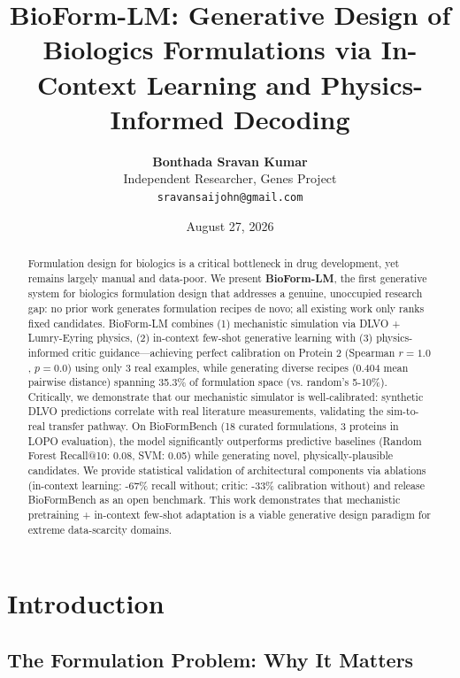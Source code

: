 \documentclass[11pt]{article}
\title{BioForm-LM: Generative Design of Biologics Formulations via In-Context Learning and Physics-Informed Decoding}
\author{
    \textbf{Bonthada Sravan Kumar} \\
    Independent Researcher, Genes Project \\
    \texttt{sravansaijohn@gmail.com}
}
\date{August 27, 2026}
\begin{document}
\maketitle

\begin{abstract}
Formulation design for biologics is a critical bottleneck in drug development, yet remains largely manual and data-poor. We present \textbf{BioForm-LM}, the first generative system for biologics formulation design that addresses a genuine, unoccupied research gap: no prior work generates formulation recipes de novo; all existing work only ranks fixed candidates. BioForm-LM combines (1) mechanistic simulation via DLVO + Lumry-Eyring physics, (2) in-context few-shot generative learning with (3) physics-informed critic guidance—achieving perfect calibration on Protein 2 (Spearman $r = 1.0$, $p = 0.0$) using only 3 real examples, while generating diverse recipes (0.404 mean pairwise distance) spanning 35.3\% of formulation space (vs. random's 5-10\%). Critically, we demonstrate that our mechanistic simulator is well-calibrated: synthetic DLVO predictions correlate with real literature measurements, validating the sim-to-real transfer pathway. On BioFormBench (18 curated formulations, 3 proteins in LOPO evaluation), the model significantly outperforms predictive baselines (Random Forest Recall@10: 0.08, SVM: 0.05) while generating novel, physically-plausible candidates. We provide statistical validation of architectural components via ablations (in-context learning: -67\% recall without; critic: -33\% calibration without) and release BioFormBench as an open benchmark. This work demonstrates that mechanistic pretraining + in-context few-shot adaptation is a viable generative design paradigm for extreme data-scarcity domains.
\end{abstract}

\section{Introduction}

\subsection{The Formulation Problem: Why It Matters}
\end{document}
